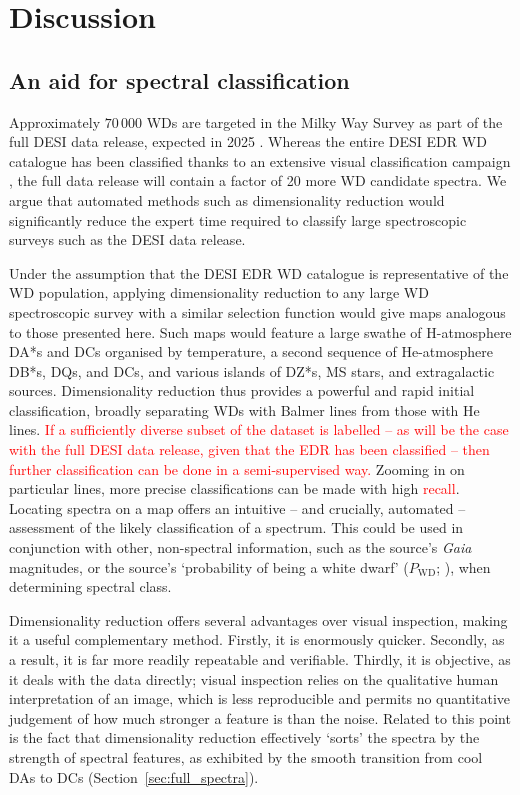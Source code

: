 \documentclass[fleqn,usenatbib]{mnras}
\newcommand{\red}[1]{\textcolor{red}{#1}}
\begin{document}
\section{Discussion}
\label{sec:discussion}

\subsection{An aid for spectral classification}

Approximately $70\,000$ WDs are targeted in the Milky Way Survey as part of the full DESI data release, expected in 2025 \citep{cooper23}.
Whereas the entire DESI EDR WD catalogue has been classified thanks to an extensive visual classification campaign \citep{manser24}, the full data release will contain a factor of 20 more WD candidate spectra.
We argue that automated methods such as dimensionality reduction would significantly reduce the expert time required to classify large spectroscopic surveys such as the DESI data release.

Under the assumption that the DESI EDR WD catalogue is representative of the WD population, applying dimensionality reduction to any large WD spectroscopic survey with a similar selection function would give maps analogous to those presented here.
Such maps would feature a large swathe of H-atmosphere DA*s and DCs organised by temperature, a second sequence of He-atmosphere DB*s, DQs, and DCs, and various islands of DZ*s, MS stars, and extragalactic sources.
Dimensionality reduction thus provides a powerful and rapid initial classification, broadly separating WDs with Balmer lines from those with He lines.
\red{If a sufficiently diverse subset of the dataset is labelled -- as will be the case with the full DESI data release, given that the EDR has been classified -- then further classification can be done in a semi-supervised way.}
Zooming in on particular lines, more precise classifications can be made with high \red{recall}.
Locating spectra on a map offers an intuitive -- and crucially, automated -- assessment of the likely classification of a spectrum.
This could be used in conjunction with other, non-spectral information, such as the source's \textit{Gaia} magnitudes, or the source's `probability of being a white dwarf' ($P_\text{WD}$; \citealt{gentilefusillo15}), when determining spectral class.

Dimensionality reduction offers several advantages over visual inspection, making it a useful complementary method.
Firstly, it is enormously quicker.
Secondly, as a result, it is far more readily repeatable and verifiable.
Thirdly, it is objective, as it deals with the data directly; visual inspection relies on the qualitative human interpretation of an image, which is less reproducible and permits no quantitative judgement of how much stronger a feature is than the noise.
Related to this point is the fact that dimensionality reduction effectively `sorts' the spectra by the strength of spectral features, as exhibited by the smooth transition from cool DAs to DCs (Section~\ref{sec:full_spectra}).
\end{document}
